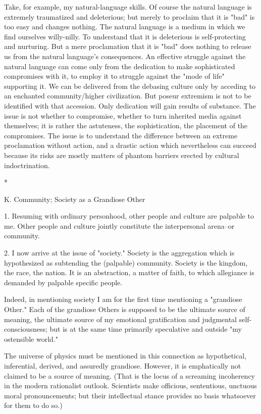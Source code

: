 Take, for example, my natural-language skills. Of course the natural language is extremely traumatized and deleterious; but merely to proclaim that it is "bad" is too easy and changes nothing. The natural language is a medium in which we find ourselves willy-nilly. To understand that it is deleterious is self-protecting and nurturing. But a mere proclamation that it is "bad" does nothing to release us from the natural language's consequences. An effective struggle against the natural language can come only from the dedication to make sophisticated compromises with it, to employ it to struggle against the "mode of life" supporting it. We can be delivered from the debasing culture only by acceding to an enchanted community/higher civilization. But poseur extremism is not to be identified with that accession. Only dedication will gain results of substance. The issue is not whether to compromise, whether to turn inherited media against themselves; it is rather the astuteness, the sophistication, the placement of the compromises. The issue is to understand the difference between an extreme proclamation without action, and a drastic action which nevertheless can succeed because its risks are mostly matters of phantom barriers erected by cultural indoctrination.

*

K. Community; Society as a Grandiose Other

1. Resuming with ordinary personhood, other people and culture are palpable to me. Other people and culture jointly constitute the interpersonal arena--or community.

2. I now arrive at the issue of "society." Society is the aggregation which is hypothesized as subtending the (palpable) community. Society is the kingdom, the race, the nation. It is an abstraction, a matter of faith, to which allegiance is demanded by palpable specific people.

Indeed, in mentioning society I am for the first time mentioning a "grandiose Other." Each of the grandiose Others is supposed to be the ultimate source of meaning, the ultimate source of my emotional gratification and judgmental self-consciousness; but is at the same time primarily speculative and outside "my ostensible world."

The universe of physics must be mentioned in this connection as hypothetical, inferential, derived, and assuredly grandiose. However, it is emphatically not claimed to be a source of meaning. (That is the locus of a screaming incoherency in the modern rationalist outlook. Scientists make officious, sententious, unctuous moral pronouncements; but their intellectual stance provides no basis whatsoever for them to do so.)

